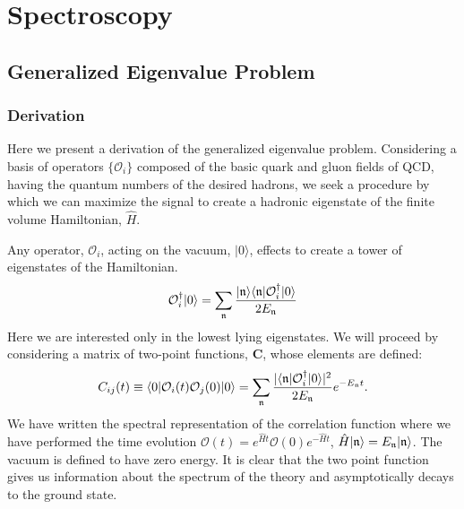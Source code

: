 \chapter{Spectroscopy}





\section{Generalized Eigenvalue Problem}\label{app::GEVP}



\subsection{Derivation}
Here we present a derivation of the generalized eigenvalue problem. Considering a basis of operators $\{\mathcal{O}_i\}$ composed of the basic quark and gluon fields of QCD, having the quantum numbers of the desired hadrons, we seek a procedure by which we can maximize the signal to create a hadronic eigenstate of the finite volume Hamiltonian, $\hat{H}$.

Any operator, $\mathcal{O}_i$, acting on the vacuum, $| 0 \rangle $,  effects to create a tower of eigenstates of the Hamiltonian. 
\begin{equation}
\mathcal{O}_i^\dagger | 0 \rangle = \sum_{\mathfrak{n}} \frac{ | \mathfrak{n} \rangle \langle \mathfrak{n} | \mathcal{O}_i^\dagger | 0 \rangle }{2E_{\mathfrak{n}}}  
\end{equation}
Here we are interested only in the lowest lying eigenstates. We will proceed by considering a matrix of two-point functions, $\mathbf{C}$, whose elements are defined:
\begin{equation*}
C_{ij}(t)  \equiv \langle 0 | \mathcal{O}_i(t) \mathcal{O}_j(0) | 0 \rangle = \sum_{\mathfrak{n}} \frac{| \langle \mathfrak{n} | \mathcal{O}_i^\dagger | 0 \rangle |^2}{2E_{\mathfrak{n}}}  e^{-E_{\mathfrak{n}} t}.
\end{equation*}
We have written the spectral representation of the correlation function where we have performed the time evolution $\mathcal{O}(t) = e^{\hat{H}t}\mathcal{O}(0)e^{-\hat{H}t}$, $\hat{H}|\mathfrak{n} \rangle =  E_{\mathfrak{n}}|\mathfrak{n} \rangle$. The vacuum is defined to have zero energy. It is clear that the two point function gives us information about the spectrum of the theory and asymptotically decays to the ground state.

